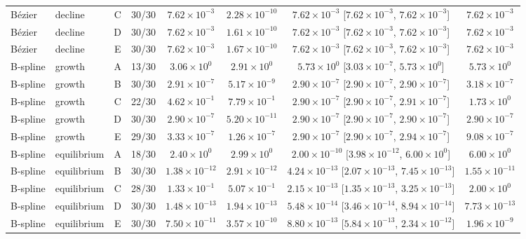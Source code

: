 \begin{tabular}{llcccccc}
B\'ezier & decline & C & 30/30 & $7.62\times10^{-3}$ & $2.28\times10^{-10}$ & $7.62\times10^{-3}$ [$7.62\times10^{-3}$, $7.62\times10^{-3}$] & $7.62\times10^{-3}$\\
B\'ezier & decline & D & 30/30 & $7.62\times10^{-3}$ & $1.61\times10^{-10}$ & $7.62\times10^{-3}$ [$7.62\times10^{-3}$, $7.62\times10^{-3}$] & $7.62\times10^{-3}$\\
B\'ezier & decline & E & 30/30 & $7.62\times10^{-3}$ & $1.67\times10^{-10}$ & $7.62\times10^{-3}$ [$7.62\times10^{-3}$, $7.62\times10^{-3}$] & $7.62\times10^{-3}$\\
B-spline & growth & A & 13/30 & $3.06\times10^{0}$ & $2.91\times10^{0}$ & $5.73\times10^{0}$ [$3.03\times10^{-7}$, $5.73\times10^{0}$] & $5.73\times10^{0}$\\
B-spline & growth & B & 30/30 & $2.91\times10^{-7}$ & $5.17\times10^{-9}$ & $2.90\times10^{-7}$ [$2.90\times10^{-7}$, $2.90\times10^{-7}$] & $3.18\times10^{-7}$\\
B-spline & growth & C & 22/30 & $4.62\times10^{-1}$ & $7.79\times10^{-1}$ & $2.90\times10^{-7}$ [$2.90\times10^{-7}$, $2.91\times10^{-7}$] & $1.73\times10^{0}$\\
B-spline & growth & D & 30/30 & $2.90\times10^{-7}$ & $5.20\times10^{-11}$ & $2.90\times10^{-7}$ [$2.90\times10^{-7}$, $2.90\times10^{-7}$] & $2.90\times10^{-7}$\\
B-spline & growth & E & 29/30 & $3.33\times10^{-7}$ & $1.26\times10^{-7}$ & $2.90\times10^{-7}$ [$2.90\times10^{-7}$, $2.94\times10^{-7}$] & $9.08\times10^{-7}$\\
B-spline & equilibrium & A & 18/30 & $2.40\times10^{0}$ & $2.99\times10^{0}$ & $2.00\times10^{-10}$ [$3.98\times10^{-12}$, $6.00\times10^{0}$] & $6.00\times10^{0}$\\
B-spline & equilibrium & B & 30/30 & $1.38\times10^{-12}$ & $2.91\times10^{-12}$ & $4.24\times10^{-13}$ [$2.07\times10^{-13}$, $7.45\times10^{-13}$] & $1.55\times10^{-11}$\\
B-spline & equilibrium & C & 28/30 & $1.33\times10^{-1}$ & $5.07\times10^{-1}$ & $2.15\times10^{-13}$ [$1.35\times10^{-13}$, $3.25\times10^{-13}$] & $2.00\times10^{0}$\\
B-spline & equilibrium & D & 30/30 & $1.48\times10^{-13}$ & $1.94\times10^{-13}$ & $5.48\times10^{-14}$ [$3.46\times10^{-14}$, $8.94\times10^{-14}$] & $7.73\times10^{-13}$\\
B-spline & equilibrium & E & 30/30 & $7.50\times10^{-11}$ & $3.57\times10^{-10}$ & $8.80\times10^{-13}$ [$5.84\times10^{-13}$, $2.34\times10^{-12}$] & $1.96\times10^{-9}$\\

\end{tabular}

